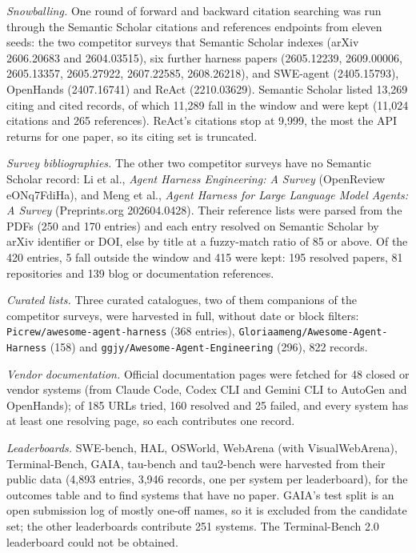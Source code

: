 \emph{Snowballing.} One round of forward and backward citation searching was run through the Semantic
Scholar citations and references endpoints from eleven seeds: the two competitor surveys that
Semantic Scholar indexes (arXiv 2606.20683 and 2604.03515), six further harness papers (2605.12239,
2609.00006, 2605.13357, 2605.27922, 2607.22585, 2608.26218), and SWE-agent (2405.15793), OpenHands
(2407.16741) and ReAct (2210.03629). Semantic Scholar listed 13,269 citing and cited records, of which
11,289 fall in the window and were kept (11,024 citations and 265 references). ReAct's citations stop
at 9,999, the most the API returns for one paper, so its citing set is truncated.

\emph{Survey bibliographies.} The other two competitor surveys have no Semantic Scholar record: Li et
al., \emph{Agent Harness Engineering: A Survey} (OpenReview eONq7FdiHa), and Meng et al., \emph{Agent
Harness for Large Language Model Agents: A Survey} (Preprints.org 202604.0428). Their reference lists
were parsed from the PDFs (250 and 170 entries) and each entry resolved on Semantic Scholar by arXiv
identifier or DOI, else by title at a fuzzy-match ratio of 85 or above. Of the 420 entries, 5 fall
outside the window and 415 were kept: 195 resolved papers, 81 repositories and 139 blog or
documentation references.

\emph{Curated lists.} Three curated catalogues, two of them companions of the competitor surveys,
were harvested in full, without date or block filters: \texttt{Picrew/awesome-agent-harness} (368
entries), \texttt{Gloriaameng/Awesome-Agent-Harness} (158) and \texttt{ggjy/Awesome-Agent-Engineering}
(296), 822 records.

\emph{Vendor documentation.} Official documentation pages were fetched for 48 closed or vendor
systems (from Claude Code, Codex CLI and Gemini CLI to AutoGen and OpenHands); of 185 URLs tried, 160
resolved and 25 failed, and every system has at least one resolving page, so each contributes one
record.

\emph{Leaderboards.} SWE-bench, HAL, OSWorld, WebArena (with VisualWebArena), Terminal-Bench, GAIA,
tau-bench and tau2-bench were harvested from their public data (4,893 entries, 3,946 records, one per
system per leaderboard), for the outcomes table and to find systems that have no paper. GAIA's test
split is an open submission log of mostly one-off names, so it is excluded from the candidate set;
the other leaderboards contribute 251 systems. The Terminal-Bench 2.0 leaderboard could not be
obtained.

